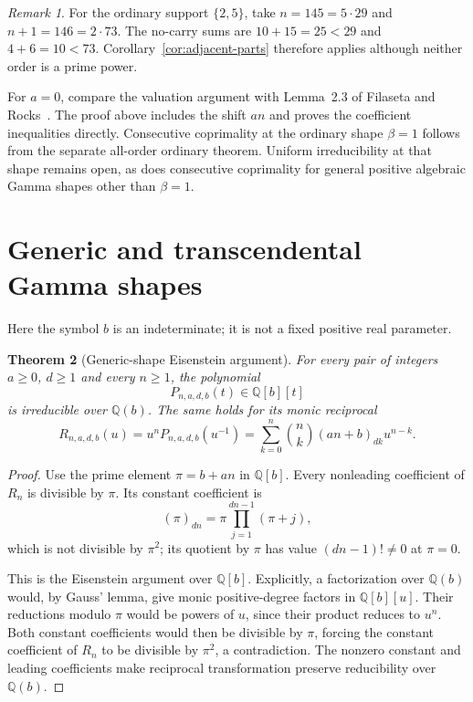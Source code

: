 \documentclass[11pt]{article}
\newtheorem{theorem}{Theorem}
\theoremstyle{remark}
\newtheorem{remark}[theorem]{Remark}
\newcommand{\Q}{\mathbb Q}
\begin{document}
\begin{remark}\label{rem:prime-power-scope}
For the ordinary support $\{2,5\}$, take
$n=145=5\cdot29$ and $n+1=146=2\cdot73$.
The no-carry sums are $10+15=25<29$ and $4+6=10<73$.
Corollary~\ref{cor:adjacent-parts} therefore applies although neither
order is a prime power.

For $a=0$, compare the valuation argument with Lemma~2.3 of
Filaseta and Rocks~\cite{FR}. The proof above includes the shift $an$
and proves the coefficient inequalities directly.
Consecutive coprimality at the ordinary shape $\beta=1$ follows from
the separate all-order ordinary theorem. Uniform irreducibility at
that shape remains open, as does consecutive coprimality for general
positive algebraic Gamma shapes other than $\beta=1$.
\end{remark}

\section{Generic and transcendental Gamma shapes}

Here the symbol $b$ is an indeterminate; it is not a fixed positive
real parameter.

\begin{theorem}[Generic-shape Eisenstein argument]\label{thm:generic-shape}
For every pair of integers $a\ge0$, $d\ge1$ and every $n\ge1$, the
polynomial
\[
 P_{n,a,d,b}(t)\in\Q[b][t]
\]
is irreducible over $\Q(b)$. The same holds for its monic reciprocal
\[
 R_{n,a,d,b}(u)
 =u^nP_{n,a,d,b}(u^{-1})
 =\sum_{k=0}^n\binom nk(an+b)_{dk}u^{n-k}.
\]
\end{theorem}
\begin{proof}
Use the prime element $\pi=b+an$ in $\Q[b]$.
Every nonleading coefficient of $R_n$ is divisible by $\pi$.
Its constant coefficient is
\[
 (\pi)_{dn}=\pi\prod_{j=1}^{dn-1}(\pi+j),
\]
which is not divisible by $\pi^2$; its quotient by $\pi$ has value
$(dn-1)!\ne0$ at $\pi=0$.

This is the Eisenstein argument over $\Q[b]$.
Explicitly, a factorization over $\Q(b)$ would, by Gauss' lemma,
give monic positive-degree factors in $\Q[b][u]$.
Their reductions modulo $\pi$ would be powers of $u$, since their
product reduces to $u^n$. Both constant coefficients would then be
divisible by $\pi$, forcing the constant coefficient of $R_n$ to be
divisible by $\pi^2$, a contradiction.
The nonzero constant and leading coefficients make reciprocal
transformation preserve reducibility over $\Q(b)$.
\end{proof}
\end{document}
